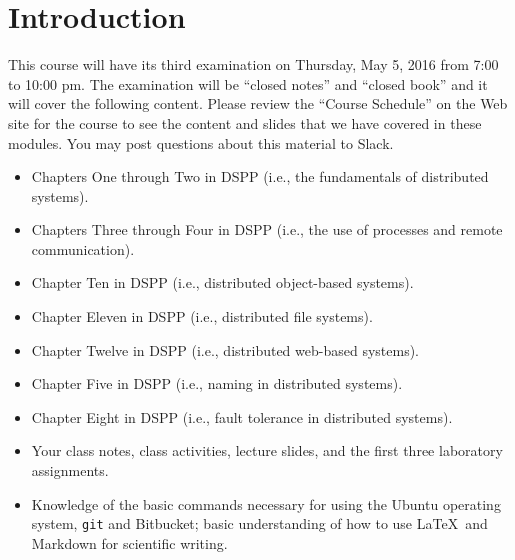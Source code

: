 


\vspace*{-.35in}
\section*{Introduction}
\vspace*{-.05in}

This course will have its third examination on Thursday, May 5, 2016 from 7:00 to 10:00 pm. The examination will be
``closed notes'' and ``closed book'' and it will cover the following content. Please review the ``Course Schedule'' on
the Web site for the course to see the content and slides that we have covered in these modules. You may post questions
about this material to Slack.

\vspace*{-.05in}

\begin{itemize}

  \itemsep 0in

  \item Chapters One through Two in DSPP (i.e., the fundamentals of distributed systems).

  \item Chapters Three through Four in DSPP (i.e., the use of processes and remote communication).

  \item Chapter Ten in DSPP (i.e., distributed object-based systems).

  \item Chapter Eleven in DSPP (i.e., distributed file systems).

  \item Chapter Twelve in DSPP (i.e., distributed web-based systems).

  \item Chapter Five in DSPP (i.e., naming in distributed systems).

  \item Chapter Eight in DSPP (i.e., fault tolerance in distributed systems).

  \item Your class notes, class activities, lecture slides, and the first three laboratory assignments.

  \item Knowledge of the basic commands necessary for using the Ubuntu operating system, {\tt git} and Bitbucket; basic
    understanding of how to use \LaTeX~and Markdown for scientific writing.

\end{itemize}

